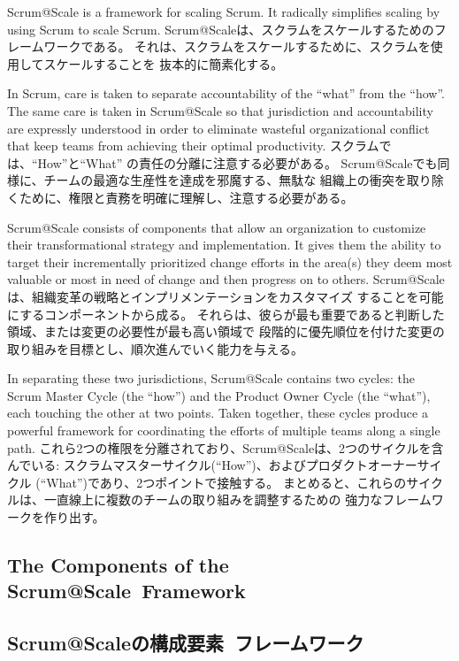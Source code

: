 \documentclass[12pt,a4paper,parskip=full]{scrartcl}
\begin{document}
Scrum@Scale is a framework for scaling Scrum. It radically simplifies
scaling by using Scrum to scale Scrum. 
\fi
Scrum@Scaleは、スクラムをスケールするためのフレームワークである。
それは、スクラムをスケールするために、スクラムを使用してスケールすることを
抜本的に簡素化する。

In Scrum, care is taken to separate accountability of the ``what'' from the
``how''. The same care is taken in Scrum@Scale so that jurisdiction and
accountability are expressly understood in order to eliminate wasteful
organizational conflict that keep teams from achieving their optimal
productivity.
\fi
スクラムでは、``How''と``What'' の責任の分離に注意する必要がある。
Scrum@Scaleでも同様に、チームの最適な生産性を達成を邪魔する、無駄な
組織上の衝突を取り除くために、権限と責務を明確に理解し、注意する必要がある。

Scrum@Scale consists of components that allow an organization to
customize their transformational strategy and implementation. It gives them
the ability to target their incrementally prioritized change efforts in the area(s) they deem
most valuable or most in need of change and then progress on to others.
\fi
Scrum@Scaleは、組織変革の戦略とインプリメンテーションをカスタマイズ
することを可能にするコンポーネントから成る。
それらは、彼らが最も重要であると判断した領域、または変更の必要性が最も高い領域で
段階的に優先順位を付けた変更の取り組みを目標とし、順次進んでいく能力を与える。

In separating these two jurisdictions, Scrum@Scale contains two cycles: the
Scrum Master Cycle (the ``how'') and the Product Owner Cycle (the
``what''), each touching the other at two points. Taken together, these
cycles produce a powerful framework for coordinating the efforts of
multiple teams along a single path.
\fi
これら2つの権限を分離されており、Scrum@Scaleは、2つのサイクルを含んでいる:
スクラムマスターサイクル(``How'')、およびプロダクトオーナーサイクル
(``What'')であり、2つポイントで接触する。
まとめると、これらのサイクルは、一直線上に複数のチームの取り組みを調整するための
強力なフレームワークを作り出す。

\subsection{The Components of the Scrum@Scale\textregistered ~Framework}
\fi
\subsection{Scrum@Scaleの構成要素\textregistered ~フレームワーク}
\end{document}
